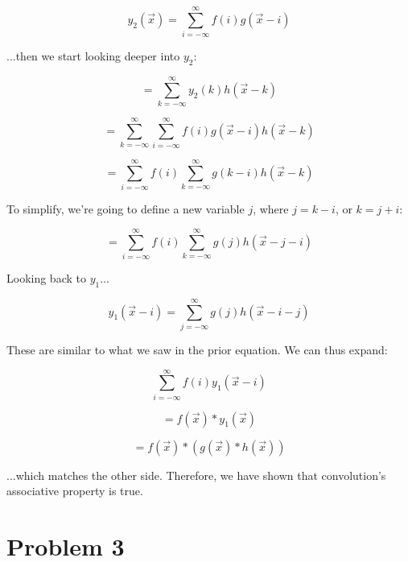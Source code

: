 \documentclass{article}
\begin{document}
\begin{equation}
    y_2(\vec{x}) = \sum^\infty_{i=-\infty} f(i) g(\vec{x}-i)
\end{equation}

...then we start looking deeper into $y_2$:

\begin{equation}
    =\sum^\infty_{k=-\infty} y_2(k) h(\vec{x}-k)
\end{equation}

\begin{equation}
    =\sum^\infty_{k=-\infty} \sum^\infty_{i=-\infty} f(i) g(\vec{x}-i) h(\vec{x}-k)
\end{equation}

\begin{equation}
    =\sum^\infty_{i=-\infty}f(i) \sum^{\infty}_{k=-\infty} g(k-i) h(\vec{x}-k)
\end{equation}

To simplify, we're going to define a new variable $j$, where $j=k-i$, or $k=j+i$:

\begin{equation}
    =\sum^\infty_{i=-\infty} f(i) \sum^\infty_{k=-\infty} g(j) h(\vec{x}-j-i)
\end{equation}

Looking back to $y_1$...

\begin{equation}
    y_1(\vec{x}-i) = \sum^\infty_{j=-\infty} g(j) h(\vec{x}-i-j)
\end{equation}

These are similar to what we saw in the prior equation. We can thus expand:

\begin{equation}
    \sum^\infty_{i=-\infty} f(i) y_1(\vec{x}-i)
\end{equation}

\begin{equation}
    = f (\vec{x}) * y_1 (\vec{x})
\end{equation}

\begin{equation}
    =f(\vec{x})*(g(\vec{x})*h(\vec{x}))
\end{equation}

...which matches the other side. Therefore, we have shown that convolution's associative property is true.

\section*{Problem 3}
\end{document}
